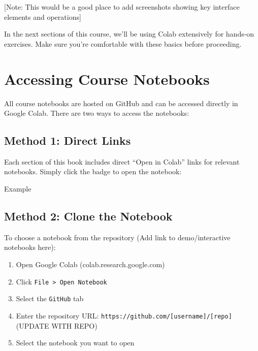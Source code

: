 \documentclass[
  letterpaper,
  DIV=11,
  numbers=noendperiod]{scrreprt}
\providecommand{\tightlist}{%
  \setlength{\itemsep}{0pt}\setlength{\parskip}{0pt}}\usepackage{longtable,booktabs,array}
\begin{document}
{[}Note: This would be a good place to add screenshots showing key
interface elements and operations{]}

In the next sections of this course, we'll be using Colab extensively
for hands-on exercises. Make sure you're comfortable with these basics
before proceeding.

\hypertarget{accessing-course-notebooks}{%
\section{Accessing Course Notebooks}\label{accessing-course-notebooks}}

All course notebooks are hosted on GitHub and can be accessed directly
in Google Colab. There are two ways to access the notebooks:

\hypertarget{method-1-direct-links}{%
\subsection{Method 1: Direct Links}\label{method-1-direct-links}}

Each section of this book includes direct ``Open in Colab'' links for
relevant notebooks. Simply click the badge to open the notebook:

Example
\href{https://colab.research.google.com/github/cropmosaiks/crop-modeling/blob/main/code/3_task_modeling/model_1_sensor.ipynb}{}

\hypertarget{method-2-clone-the-notebook}{%
\subsection{Method 2: Clone the
Notebook}\label{method-2-clone-the-notebook}}

To choose a notebook from the repository (Add link to demo/interactive
notebooks here):

\begin{enumerate}
\def\labelenumi{\arabic{enumi}.}
\tightlist
\item
  Open Google Colab (colab.research.google.com)
\item
  Click \texttt{File\ \textgreater{}\ Open\ Notebook}
\item
  Select the \texttt{GitHub} tab
\item
  Enter the repository URL:
  \texttt{https://github.com/{[}username{]}/{[}repo{]}} (UPDATE WITH
  REPO)
\item
  Select the notebook you want to open
\end{enumerate}
\end{document}
